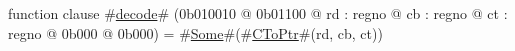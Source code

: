 function clause #\hyperref[zdecode]{decode}# (0b010010 @ 0b01100 @ rd : regno @ cb : regno @ ct : regno @ 0b000 @ 0b000) = #\hyperref[zSome]{Some}#(#\hyperref[zCToPtr]{CToPtr}#(rd, cb, ct))
